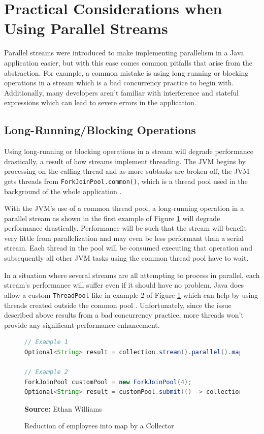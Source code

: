 \documentclass[oneside, 12pt]{article}
\newcommand{\source}[1]{\textbf{Source:} {#1} }
\begin{document}
\section{Practical Considerations when Using Parallel Streams}
Parallel streams were introduced to make implementing parallelism in a Java application easier, but with this ease comes common pitfalls that arise from the abstraction. For example, a common mistake is using long-running or blocking operations in a stream which is a bad concurrency practice to begin with. Additionally, many developers aren't familiar with interference and stateful expressions which can lead to severe errors in the application.

\subsection{Long-Running/Blocking Operations}
Using long-running or blocking operations in a stream will degrade performance drastically, a result of how streams implement threading. The JVM begins by processing on the calling thread and as more subtasks are broken off, the JVM gets threads from \verb|ForkJoinPool.common()|, which is a thread pool used in the background of the whole application \autocite{dzone_dangers}. 

With the JVM's use of a common thread pool, a long-running operation in a parallel stream as shown in the first example of Figure \ref{fig:network_op} will degrade performance drastically. Performance will be such that the stream will benefit very little from parallelization and may even be less performant than a serial stream. Each thread in the pool will be consumed executing that operation and subsequently all other JVM tasks using the common thread pool have to wait. 

In a situation where several streams are all attempting to process in parallel, each stream's performance will suffer even if it should have no problem. Java does allow a custom \verb|ThreadPool| like in example 2 of Figure \ref{fig:network_op} which can help by using threads created outside the common pool \autocite{dzone_fjp}. Unfortunately, since the issue described above results from a bad concurrency practice, more threads won't provide any significant performance enhancement.

\begin{figure}[H]
\centering
\begin{lstlisting}[language=Java]
// Example 1
Optional<String> result = collection.stream().parallel().map((base) -> longOperation(argument)).findAny();

// Example 2
ForkJoinPool customPool = new ForkJoinPool(4);
Optional<String> result = customPool.submit(() -> collection.stream().parallel().map((arg) -> longOperation(arg)).findAny()).get();
\end{lstlisting}
\caption{Reduction of employees into map by a Collector}
\source{Ethan Williams}
\label{fig:network_op}
\end{figure}
\end{document}
